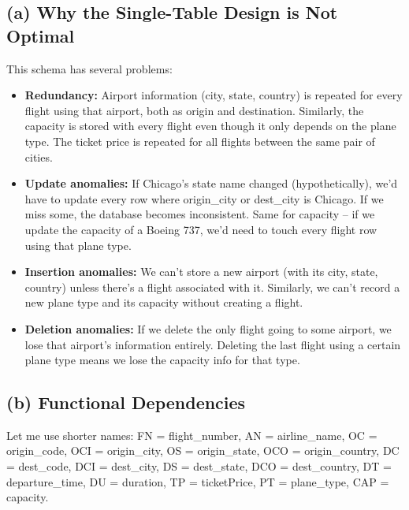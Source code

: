 \documentclass[11pt]{article}
\begin{document}
\subsection{(a) Why the Single-Table Design is Not Optimal}

This schema has several problems:

\begin{itemize}
  \item \textbf{Redundancy:} Airport information (city, state, country) is repeated for every flight using that airport, both as origin and destination. Similarly, the capacity is stored with every flight even though it only depends on the plane type. The ticket price is repeated for all flights between the same pair of cities.

  \item \textbf{Update anomalies:} If Chicago's state name changed (hypothetically), we'd have to update every row where origin\_city or dest\_city is Chicago. If we miss some, the database becomes inconsistent. Same for capacity -- if we update the capacity of a Boeing 737, we'd need to touch every flight row using that plane type.

  \item \textbf{Insertion anomalies:} We can't store a new airport (with its city, state, country) unless there's a flight associated with it. Similarly, we can't record a new plane type and its capacity without creating a flight.

  \item \textbf{Deletion anomalies:} If we delete the only flight going to some airport, we lose that airport's information entirely. Deleting the last flight using a certain plane type means we lose the capacity info for that type.
\end{itemize}

\subsection{(b) Functional Dependencies}

Let me use shorter names: FN = flight\_number, AN = airline\_name, OC = origin\_code, OCI = origin\_city, OS = origin\_state, OCO = origin\_country, DC = dest\_code, DCI = dest\_city, DS = dest\_state, DCO = dest\_country, DT = departure\_time, DU = duration, TP = ticketPrice, PT = plane\_type, CAP = capacity.
\end{document}
